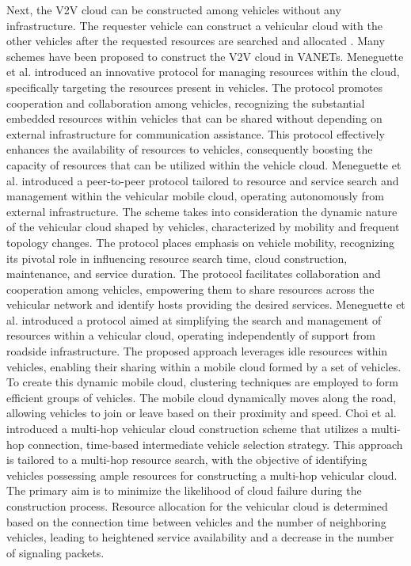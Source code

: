\documentclass[sensors,article,accept,moreauthors,pdftex]{Definitions/mdpi}
\begin{document}
Next, the V2V cloud can be constructed among vehicles without any infrastructure. The requester vehicle can construct a vehicular cloud with the other vehicles after the requested resources are searched and allocated \cite{Sibai2015, Meneguette2016, Meneguette2017b, Meneguette2017a, Choi2018}. Many schemes have been proposed to construct the V2V cloud in VANETs.
Meneguette et al. \cite{Meneguette2016} introduced an innovative protocol for managing resources within the cloud, specifically targeting the resources present in vehicles. The protocol promotes cooperation and collaboration among vehicles, recognizing the substantial embedded resources within vehicles that can be shared without depending on external infrastructure for communication assistance. This protocol effectively enhances the availability of resources to vehicles, consequently boosting the capacity of resources that can be utilized within the vehicle cloud.
\linebreak  Meneguette et al. \cite{Meneguette2017b} introduced a peer-to-peer protocol tailored to resource and service search and management within the vehicular mobile cloud, operating autonomously from external infrastructure. The scheme takes into consideration the dynamic nature of the vehicular cloud shaped by vehicles, characterized by mobility and frequent topology changes. The protocol places emphasis on vehicle mobility, recognizing its pivotal role in influencing resource search time, cloud construction, maintenance, and service duration. The protocol facilitates collaboration and cooperation among vehicles, empowering them to share resources across the vehicular network and identify hosts providing the desired services.
\linebreak  Meneguette et al. \cite{Meneguette2017a} introduced a protocol aimed at simplifying the search and management of resources within a vehicular cloud, operating independently of support from roadside infrastructure. The proposed approach leverages idle resources within vehicles, enabling their sharing within a mobile cloud formed by a set of vehicles. To create this dynamic mobile cloud, clustering techniques are employed to form efficient groups of vehicles. The mobile cloud dynamically moves along the road, allowing vehicles to join or leave based on their proximity and speed.
Choi et al. \cite{Choi2018} introduced a multi-hop vehicular cloud construction scheme that utilizes a multi-hop connection, time-based intermediate vehicle selection strategy. This approach is tailored to a multi-hop resource search, with the objective of identifying vehicles possessing ample resources for constructing a multi-hop vehicular cloud. The primary aim is to minimize the likelihood of cloud failure during the construction process. Resource allocation for the vehicular cloud is determined based on the connection time between vehicles and the number of neighboring vehicles, leading to heightened service availability and a decrease in the number of signaling packets.
\end{document}
